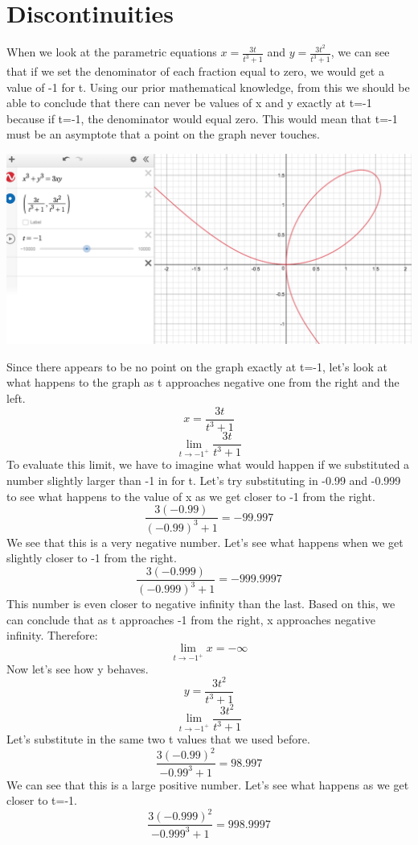 \documentclass[a4paper,openright, 10pt]{article}
\begin{document}
\section*{Discontinuities}
When we look at the parametric equations $x=\frac{3t}{t^3+1}$ and $y=\frac{3t^2}{t^3+1}$, we can see that if we set the denominator of each fraction equal to zero, we would get a value of -1 for t. Using our prior mathematical knowledge, from this we should be able to conclude that there can never be values of x and y exactly at t=-1 because if t=-1, the denominator would equal zero. This would mean that t=-1 must be an asymptote that a point on the graph never touches.
\begin{center}
    \includegraphics[scale=0.45]{graph5}
\end{center}
Since there appears to be no point on the graph exactly at t=-1, let's look at what happens to the graph as t approaches negative one from the right and the left. 
$$x=\frac{3t}{t^3+1}$$
$$\lim_{t\to-1^+} \frac{3t}{t^3+1}$$
To evaluate this limit, we have to imagine what would happen if we substituted a number slightly larger than -1 in for t. Let's try substituting in -0.99 and -0.999 to see what happens to the value of x as we get closer to -1 from the right. 
$$\frac{3(-0.99)}{(-0.99)^3+1}=-99.997$$
We see that this is a very negative number. Let's see what happens when we get slightly closer to -1 from the right.
$$\frac{3(-0.999)}{(-0.999)^3+1}=-999.9997$$
This number is even closer to negative infinity than the last. Based on this, we can conclude that as t approaches -1 from the right, x approaches negative infinity. Therefore:
$$\lim_{t\to-1^+} x=-\infty$$
Now let's see how y behaves.
$$y=\frac{3t^2}{t^3+1}$$
$$\lim_{t\to-1^+} \frac{3t^2}{t^3+1}$$
Let's substitute in the same two t values that we used before.
$$\frac{3(-0.99)^2}{-0.99^3+1}=98.997$$
We can see that this is a large positive number. Let's see what happens as we get closer to t=-1.
$$\frac{3(-0.999)^2}{-0.999^3+1}=998.9997$$
\end{document}
